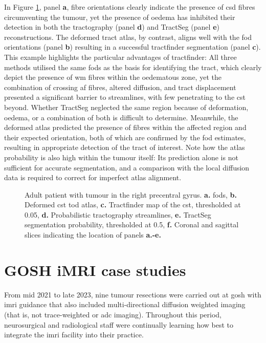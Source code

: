 In Figure \ref{fig:oedema}, panel \textbf{a}, fibre orientations clearly indicate the presence of \gls{csd} fibres circumventing the tumour, yet the presence of oedema has inhibited their detection in both the tractography (panel \textbf{d}) and TractSeg (panel \textbf{e}) reconstructions.
The deformed tract atlas, by contrast, aligns well with the \gls{fod} orientations (panel \textbf{b}) resulting in a successful tractfinder segmentation  (panel \textbf{c}).
This example highlights the particular advantages of tractfinder:
All three methods utilised the same \glspl{fod} as the basis for identifying the tract, which clearly depict the presence of \gls{wm} fibres within the oedematous zone, yet the combination of crossing \gls{af} fibres, altered diffusion, and tract displacement presented a significant barrier to streamlines, with few penetrating to the \gls{cst} beyond.
Whether TractSeg neglected the same region because of deformation, oedema, or a combination of both is difficult to determine.
Meanwhile, the deformed atlas predicted the presence of fibres within the affected region and their expected orientation, both of which are confirmed by the \gls{fod} estimates, resulting in appropriate detection of the tract of interest.
Note how the atlas probability is also high within the tumour itself:
Its prediction alone is not sufficient for accurate segmentation, and a comparison with the local diffusion data is required to correct for imperfect atlas alignment.

\begin{figure}
  
  \caption{Adult patient with tumour in the right precentral gyrus. \textbf{a.} \glspl{fod}, \textbf{b.} Deformed \gls{cst} \gls{tod} atlas, \textbf{c.} Tractfinder map of the \gls{cst}, thresholded at 0.05, \textbf{d.} Probabilistic tractography streamlines, \textbf{e.} TractSeg segmentation probability, thresholded at 0.5, \textbf{f.} Coronal and sagittal slices indicating the location of panels \textbf{a.-e.}}
  \label{fig:oedema}
\end{figure}

\clearpage
\section{GOSH iMRI case studies}\label{sec:case}

From mid 2021 to late 2023, nine tumour resections were carried out at \gls{gosh} with \gls{imri} guidance that also included multi-directional diffusion weighted imaging (that is, not trace-weighted or \gls{adc} imaging).
Throughout this period, neurosurgical and radiological staff were continually learning how best to integrate the \gls{imri} facility into their practice.

